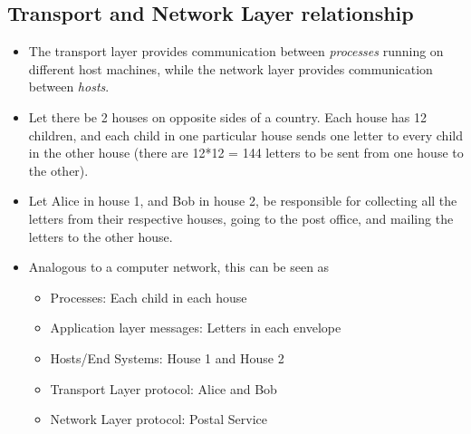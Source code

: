 \documentclass{article}
\theoremstyle{plain}
\theoremstyle{definition}
\begin{document}
\subsection{Transport and Network Layer relationship}
\begin{itemize}
    \item The transport layer provides communication between \textit{processes} running on different host machines, while the network layer provides communication between \textit{hosts}. 
    
    \item Let there be 2 houses on opposite sides of a country. Each house has 12 children, and each child in one particular house sends one letter to every child in the other house (there are 12*12 = 144 letters to be sent from one house to the other). 
    
    \item Let Alice in house 1, and Bob in house 2, be responsible for collecting all the letters from their respective houses, going to the post office, and mailing the letters to the other house. 
    
    \item Analogous to a computer network, this can be seen as
    \begin{itemize}
        \item Processes: Each child in each house
        
        \item Application layer messages: Letters in each envelope
        
        \item Hosts/End Systems: House 1 and House 2
        
        \item Transport Layer protocol: Alice and Bob
        
        \item Network Layer protocol: Postal Service
    \end{itemize}
\end{itemize}
\end{document}

